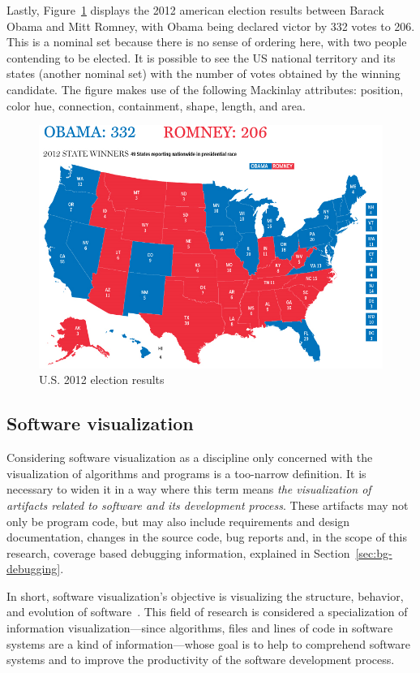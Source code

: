 Lastly, Figure~\ref{fig:johnson2012election} displays the 2012 american election
results between Barack Obama and Mitt Romney, with Obama being declared victor
by 332 votes to 206. This is a nominal set because there is no sense of ordering
here, with two people contending to be elected. It is possible to see the US
national territory and its states (another nominal set) with the number of votes
obtained by the winning candidate. The figure makes use of the following
Mackinlay attributes: position, color hue, connection, containment, shape,
length, and area.

\begin{figure}[H]
\centering
\includegraphics[width=.6\textwidth]{figures/johnson2012election}
\caption{U.S. 2012 election results~\cite{johnson2012election}}
\label{fig:johnson2012election}
\end{figure}

\subsection{Software visualization}

Considering software visualization as a discipline only concerned with the
visualization of algorithms and programs is a too-narrow definition. It is
necessary to widen it in a way where this term means \textit{the visualization
of artifacts related to software and its development process}.
These artifacts may not only be program code, but may also include requirements
and design documentation, changes in the source code, bug reports and, in the
scope of this research, coverage based debugging information, explained in
Section~\ref{sec:bg-debugging}.

In short, software visualization's objective is visualizing the structure,
behavior, and evolution of software~\cite{diehl2007software}. This field of
research is considered a specialization of information visualization---since
algorithms, files and lines of code in software systems are a kind of
information---whose goal is to help to comprehend software systems and to
improve the productivity of the software development process.

